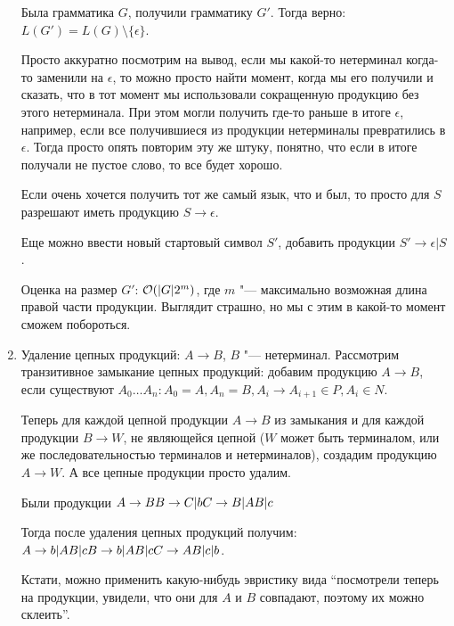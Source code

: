 \begin{enumerate}
Была грамматика $G$, получили грамматику $G'$. Тогда верно: $L(G') = L(G) \setminus \{\epsilon\}$.

Просто аккуратно посмотрим на вывод, если мы какой-то нетерминал когда-то заменили на $\epsilon$, то можно просто найти момент, когда мы его получили и сказать, что в тот момент
мы использовали сокращенную продукцию без этого нетерминала.
При этом могли получить где-то раньше в итоге $\epsilon$, например, если все получившиеся из продукции нетерминалы превратились в $\epsilon$. 
Тогда просто опять повторим эту же штуку, понятно, что если в итоге получали не пустое слово, то все будет хорошо.

\begin{Rem}
Если очень хочется получить тот же самый язык, что и был, то просто для $S$ разрешают иметь продукцию $S \to \epsilon$.

Еще можно ввести новый стартовый символ $S'$, добавить продукции $S' \to \epsilon|S$.
\end{Rem}

Оценка на размер $G'$: $\mathcal{O}(|G| 2^{m})$, где $m$ "--- максимально возможная длина правой части продукции.
Выглядит страшно, но мы с этим в какой-то момент сможем побороться.

\item
Удаление цепных продукций: $A \to B$, $B$ "--- нетерминал.
Рассмотрим транзитивное замыкание цепных продукций: добавим продукцию $A \to B$, если существуют $A_0 \dots A_n\colon A_0 = A, A_n = B, A_i \to A_{i + 1} \in P, A_i \in N$.

Теперь для каждой цепной продукции $A \to B$ из замыкания и для каждой продукции $B \to W$, не являющейся цепной 
($W$ может быть терминалом, или же последовательностью терминалов и нетерминалов), создадим продукцию $A \to W$.
А все цепные продукции просто удалим.

\begin{exmp}
Были продукции $\\
A \to B \\
B \to C | b \\
C \to B | AB | c 
$

Тогда после удаления цепных продукций получим: $\\
A \to b | AB | c \\
B \to b | AB | c \\
C \to AB | c | b
$.

Кстати, можно применить какую-нибудь эвристику вида ``посмотрели теперь на продукции, увидели, что они для $A$ и $B$ совпадают, поэтому их можно склеить''.
\end{exmp}


\end{enumerate}
